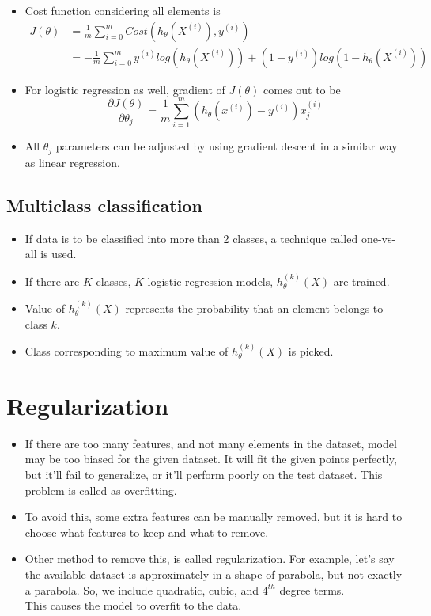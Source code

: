 \documentclass{article}
\begin{document}
\begin{itemize}
\begin{equation*}
\begin{array}{l}
			-log(1-h_\theta(X))\ \ \ \ \text{if $y=0$}\\
		\end{array}\right.
	\end{equation*}
	Here, if $y=1$, cost is $-log(h_\theta(X))$, which is 0 if $h_\theta(X)=1$, and tends to infinity if $h_\theta(X)=0$. Similarly for $y=0$.
	\item Cost function considering all elements is \begin{align*}
		J(\theta) &= \frac{1}{m} \sum_{i=0}^m Cost(h_\theta(X^{(i)}),y^{(i)})\\
		&= -\frac{1}{m} \sum_{i=0}^m y^{(i)}log(h_\theta(X^{(i)})) + (1-y^{(i)})log(1-h_\theta(X^{(i)}))
	\end{align*}
	\item For logistic regression as well, gradient of $J(\theta)$ comes out to be
	$$\frac{\partial J(\theta)}{\partial \theta_j}=\frac{1}{m} \sum_{i=1}^{m} (h_\theta(x^{(i)})-y^{(i)})x_j^{(i)}$$
	\item All $\theta_j$ parameters can be adjusted by using gradient descent in a similar way as linear regression.
\end{itemize}
\subsection{Multiclass classification}
\begin{itemize}
	\item If data is to be classified into more than 2 classes, a technique called one-vs-all is used.
	\item If there are $K$ classes, $K$ logistic regression models, $h^{(k)}_\theta(X)$ are trained.
	\item Value of  $h^{(k)}_\theta(X)$ represents the probability that an element belongs to class $k$.
	\item Class corresponding to maximum value of $h^{(k)}_\theta(X)$ is picked.
\end{itemize}

\section{Regularization}
\begin{itemize}
	\item If there are too many features, and not many elements in the dataset, model may be too biased for the given dataset. It will fit the given points perfectly, but it'll fail to generalize, or it'll perform poorly on the test dataset. This problem is called as overfitting.
		\item To avoid this, some extra features can be manually removed, but it is hard to choose what features to keep and what to remove.
		\item Other method to remove this, is called regularization. For example, let's say the available dataset is approximately in a shape of parabola, but not exactly a parabola. So, we include quadratic, cubic, and $4^{th}$ degree terms.\\ This causes the model to overfit to the data.
	\end{itemize}
\end{document}
